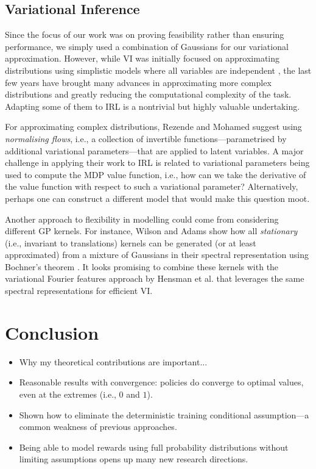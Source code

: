 \documentclass{mpaper}
\begin{document}
\subsection{Variational Inference}

Since the focus of our work was on proving feasibility rather than ensuring
performance, we simply used a combination of Gaussians for our variational
approximation. However, while VI was initially focused on approximating
distributions using simplistic models where all variables are independent
\cite{blei2017variational}, the last few years have brought many advances in
approximating more complex distributions and greatly reducing the computational
complexity of the task. Adapting some of them to IRL is a nontrivial but highly
valuable undertaking.

For approximating complex distributions, Rezende and Mohamed
\cite{DBLP:conf/icml/RezendeM15} suggest using \emph{normalising flows}, i.e., a
collection of invertible functions---parametrised by additional variational
parameters---that are applied to latent variables. A major challenge in applying
their work to IRL is related to variational parameters being used to compute the
MDP value function, i.e., how can we take the derivative of the value function
with respect to such a variational parameter? Alternatively, perhaps one can
construct a different model that would make this question moot.

Another approach to flexibility in modelling could come from considering
different GP kernels. For instance, Wilson and Adams \cite{pmlr-v28-wilson13}
show how all \emph{stationary} (i.e., invariant to translations) kernels can be
generated (or at least approximated) from a mixture of Gaussians in their
spectral representation using Bochner's theorem
\cite{bochner1959lectures,DBLP:journals/technometrics/Woodard00}. It looks
promising to combine these kernels with the variational Fourier features
approach by Hensman et al. \cite{DBLP:journals/jmlr/HensmanDS17} that leverages
the same spectral representations for efficient VI.

\section{Conclusion}

\begin{itemize}
\item Why my theoretical contributions are important...
\item Reasonable results with convergence: policies do converge to optimal
  values, even at the extremes (i.e., $0$ and $1$).
\item Shown how to eliminate the deterministic training conditional
  assumption---a common weakness of previous approaches.
\item Being able to model rewards using full probability distributions without
  limiting assumptions opens up many new research directions.
\end{itemize}
\end{document}
